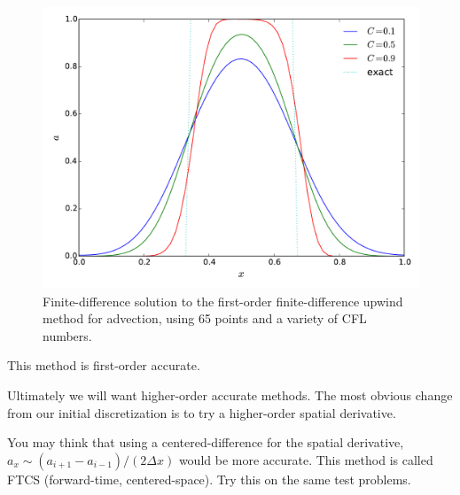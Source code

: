 \begin{figure}[t]
\centering
\includegraphics[width=0.8\linewidth]{fdadvect-upwind}
\caption[First-order finite-difference solution to linear advection]
{\label{fig:fdadvect} Finite-difference solution to the first-order
finite-difference upwind method for advection, using 65 points and
a variety of CFL numbers. \\
}
\end{figure}
%
This method is first-order accurate.  


Ultimately we will want higher-order accurate methods.  The most obvious
change from our initial discretization is to try a higher-order spatial
derivative.

\begin{exercise}
{You may think that using a centered-difference for
  the spatial derivative, $a_x \sim (a_{i+1} - a_{i-1})/(2 \Delta x)$
  would be more accurate.  This method is called FTCS (forward-time,
  centered-space).  Try this on the same test problems.}
\end{exercise}

